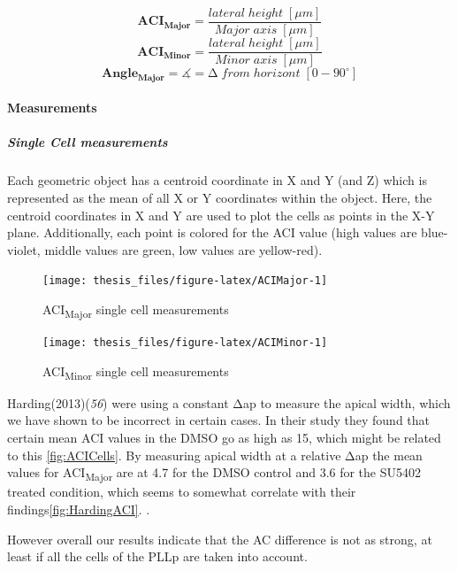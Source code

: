 \documentclass[11pt,singlespacinge,twoside]{reedthesis} %
\begin{document}
\[\mathbf{ACI_{Major}} = \frac{lateral\;height\;[\mu m]}{Major\;axis\;[\mu m]}\]
\[\mathbf{ACI_{Minor}} = \frac{lateral\;height\;[\mu m]}{Minor\;axis\;[\mu m]}\]
\[\mathbf{Angle_{Major}} = \measuredangle = \mathrm{\Delta}\;from\;horizont\;[0-90^\circ]\]

\hypertarget{ACI-Dis}{%
\paragraph{Measurements}\label{ACI-Dis}}

\hypertarget{ACI-singlecell}{%
\subparagraph{Single Cell measurements}\label{ACI-singlecell}}

Each geometric object has a centroid coordinate in X and Y (and Z) which is represented as the mean of all X or Y coordinates within the object. Here, the centroid coordinates in X and Y are used to plot the cells as points in the X-Y plane. Additionally, each point is colored for the ACI value (high values are blue-violet, middle values are green, low values are yellow-red).


\begin{figure}

{\centering \texttt{[image: thesis\_files/figure-latex/ACIMajor-1]} 

}

\caption{ACI\textsubscript{Major} single cell measurements}\label{fig:ACIMajor}
\end{figure}

\begin{figure}

{\centering \texttt{[image: thesis\_files/figure-latex/ACIMinor-1]} 

}

\caption{ACI\textsubscript{Minor} single cell measurements}\label{fig:ACIMinor}
\end{figure}
Harding(2013)(\emph{56}) were using a constant \(\mathrm{\Delta}\)ap to measure the apical width, which we have shown to be incorrect in certain cases. In their study they found that certain mean ACI values in the DMSO go as high as 15, which might be related to this \ref{fig:ACICells}.
By measuring apical width at a relative \(\mathrm{\Delta}\)ap the mean values for ACI\textsubscript{Major} are at 4.7 for the DMSO control and 3.6 for the SU5402 treated condition, which seems to somewhat correlate with their findings\ref{fig:HardingACI}. .

However overall our results indicate that the AC difference is not as strong, at least if all the cells of the PLLp are taken into account.
\end{document}

